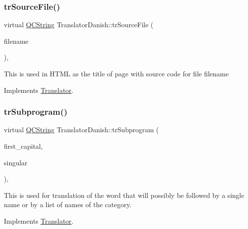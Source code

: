 \subsubsection{\texorpdfstring{trSourceFile()}{trSourceFile()}}
{\footnotesize\ttfamily virtual \mbox{\hyperlink{class_q_c_string}{Q\+C\+String}} Translator\+Danish\+::tr\+Source\+File (\begin{DoxyParamCaption}\item[{\mbox{\hyperlink{class_q_c_string}{Q\+C\+String}} \&}]{filename }\end{DoxyParamCaption})\hspace{0.3cm}{\ttfamily [inline]}, {\ttfamily [virtual]}}

This is used in H\+T\+ML as the title of page with source code for file filename 

Implements \mbox{\hyperlink{class_translator}{Translator}}.

\mbox{\label{class_translator_danish_a2506998cfc0654bed4d5575106697dd9}} 
\subsubsection{\texorpdfstring{trSubprogram()}{trSubprogram()}}
{\footnotesize\ttfamily virtual \mbox{\hyperlink{class_q_c_string}{Q\+C\+String}} Translator\+Danish\+::tr\+Subprogram (\begin{DoxyParamCaption}\item[{bool}]{first\+\_\+capital,  }\item[{bool}]{singular }\end{DoxyParamCaption})\hspace{0.3cm}{\ttfamily [inline]}, {\ttfamily [virtual]}}

This is used for translation of the word that will possibly be followed by a single name or by a list of names of the category. 

Implements \mbox{\hyperlink{class_translator}{Translator}}.

\mbox{\label{class_translator_danish_ab47e9988928a8e3900226c7abf06e0a8}} 

